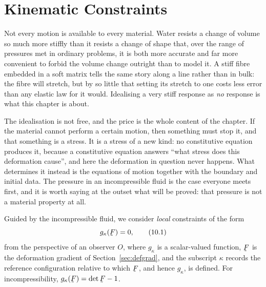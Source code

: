 \chapter{Kinematic Constraints}

Not every motion is available to every material. Water resists a change
of volume so much more stiffly than it resists a change of shape that,
over the range of pressures met in ordinary problems, it is both more
accurate and far more convenient to forbid the volume change outright
than to model it. A stiff fibre embedded in a soft matrix tells the same
story along a line rather than in bulk: the fibre will stretch, but by so
little that setting its stretch to one costs less error than any elastic
law for it would. Idealising a very stiff response as \emph{no} response
is what this chapter is about.

The idealisation is not free, and the price is the whole content of the
chapter. If the material cannot perform a certain motion, then something
must stop it, and that something is a stress. It is a stress of a new
kind: no constitutive equation produces it, because a constitutive
equation answers ``what stress does this deformation cause'', and here
the deformation in question never happens. What determines it instead is
the equations of motion together with the boundary and initial data. The
pressure in an incompressible fluid is the case everyone meets first, and
it is worth saying at the outset what will be proved: that pressure is
not a material property at all.

Guided by the incompressible fluid, we consider \emph{local} constraints
of the form
\begin{equation}
   g_{\kappa}(\bF)=0 ,
   \tag{10.1}\label{eq:10.1}
\end{equation}
from the perspective of an observer $O$, where $g_{\kappa}$ is a
scalar-valued function, $\bF$ is the deformation gradient of
Section~\ref{sec:defgrad}, and the subscript $\kappa$ records the
reference configuration relative to which $\bF$, and hence $g_{\kappa}$,
is defined. For incompressibility, $g_{\kappa}(\bF)=\det\bF-1$.


